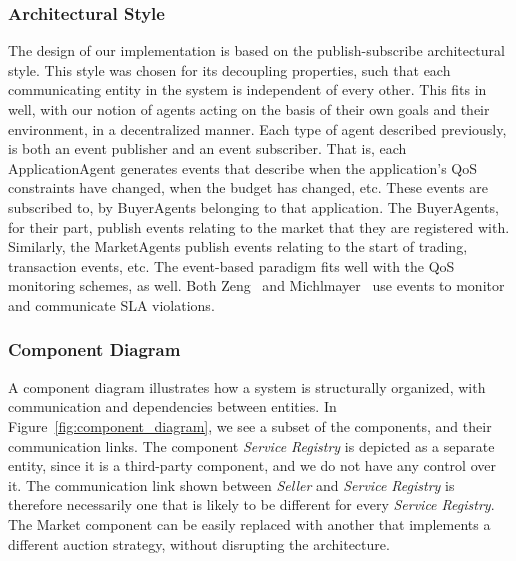 \documentclass[10pt,journal,compsoc]{IEEEtran}
\begin{document}
\subsubsection{Architectural Style} The design of our implementation is based on the publish-subscribe architectural style. This style was chosen for its decoupling properties, such that each communicating entity in the system is independent of every other. This fits in well, with our notion of agents acting on the basis of their own goals and their environment, in a decentralized manner. Each type of agent described previously, is both an event publisher and an event subscriber. That is, each ApplicationAgent generates events that describe when the application's QoS constraints have changed, when the budget has changed, etc. These events are subscribed to, by BuyerAgents belonging to that application. The BuyerAgents, for their part, publish events relating to the market that they are registered with. Similarly, the MarketAgents publish events relating to the start of trading, transaction events, etc. The event-based paradigm fits well with the QoS monitoring schemes, as well. Both Zeng~\cite{Zeng2007Monitoring} and Michlmayer~\cite{Michlmayr2009Comprehensive} use events to monitor and communicate SLA violations. 
%

\subsubsection{Component Diagram} A component diagram illustrates how a system is structurally organized, with communication and dependencies between entities. In Figure~\ref{fig:component_diagram}, we see a subset of the components, and their communication links. The component \textit{Service Registry} is depicted as a separate entity, since it is a third-party component, and we do not have any control over it. The communication link shown between \textit{Seller} and \textit{Service Registry} is therefore necessarily one that is likely to be different for every \textit{Service Registry}. The Market component can be easily replaced with another that implements a different auction strategy, without disrupting the architecture.
\end{document}
